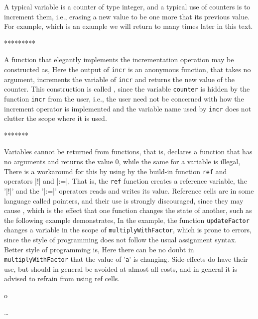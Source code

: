 A typical variable is a counter of type integer, and a typical use of counters is to increment them, i.e., erasing a new value to be one more that its previous value. For example,
%
%
which is an example we will return to many times later in this text.


*********

A function that elegantly implements the incrementation operation may be constructed as,
%
%
 Here the output of \texttt{incr} is an anonymous function, that takes no argument, increments the variable of \texttt{incr} and returns the new value of the counter. This construction is called , since the variable \texttt{counter} is hidden by the function \texttt{incr} from the user, i.e., the user need not be concerned with how the increment operator is implemented and the variable name used by \texttt{incr} does not clutter the scope where it is used.

*******

Variables cannot be returned from functions, that is,
%
%
declares a function that has no arguments and returns the value 0, while the same for a variable is illegal,
%
%
There is a workaround for this by using  by the build-in function \texttt{ref} and operators \token|!| and \token|:=|,
%
%
That is, the \texttt{ref} function creates a reference variable, the '\token|!|' and the '\token|:=|' operators reads and writes its value. Reference cells are in some language called pointers, and their use is strongly discouraged, since they may cause , which is the effect that one function changes the state of another, such as the following example demonstrates,
%
%
In the example, the function \texttt{updateFactor} changes a variable in the scope of \texttt{multiplyWithFactor}, which is prone to errors, since the style of programming does not follow the usual assignment syntax. Better style of programming is,
%
%
Here there can be no doubt in \texttt{multiplyWithFactor} that the value of '\texttt{a}' is changing. Side-effects do have their use, but should in general be avoided at almost all costs, and in general it is advised to refrain from using ref cells.






o






\dots






